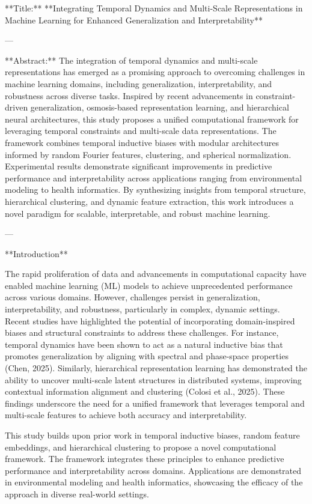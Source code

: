 **Title:**  
**Integrating Temporal Dynamics and Multi-Scale Representations in Machine Learning for Enhanced Generalization and Interpretability**

---

**Abstract:**  
The integration of temporal dynamics and multi-scale representations has emerged as a promising approach to overcoming challenges in machine learning domains, including generalization, interpretability, and robustness across diverse tasks. Inspired by recent advancements in constraint-driven generalization, osmosis-based representation learning, and hierarchical neural architectures, this study proposes a unified computational framework for leveraging temporal constraints and multi-scale data representations. The framework combines temporal inductive biases with modular architectures informed by random Fourier features, clustering, and spherical normalization. Experimental results demonstrate significant improvements in predictive performance and interpretability across applications ranging from environmental modeling to health informatics. By synthesizing insights from temporal structure, hierarchical clustering, and dynamic feature extraction, this work introduces a novel paradigm for scalable, interpretable, and robust machine learning.

---

**Introduction**  

The rapid proliferation of data and advancements in computational capacity have enabled machine learning (ML) models to achieve unprecedented performance across various domains. However, challenges persist in generalization, interpretability, and robustness, particularly in complex, dynamic settings. Recent studies have highlighted the potential of incorporating domain-inspired biases and structural constraints to address these challenges. For instance, temporal dynamics have been shown to act as a natural inductive bias that promotes generalization by aligning with spectral and phase-space properties (Chen, 2025). Similarly, hierarchical representation learning has demonstrated the ability to uncover multi-scale latent structures in distributed systems, improving contextual information alignment and clustering (Colosi et al., 2025). These findings underscore the need for a unified framework that leverages temporal and multi-scale features to achieve both accuracy and interpretability.  

This study builds upon prior work in temporal inductive biases, random feature embeddings, and hierarchical clustering to propose a novel computational framework. The framework integrates these principles to enhance predictive performance and interpretability across domains. Applications are demonstrated in environmental modeling and health informatics, showcasing the efficacy of the approach in diverse real-world settings.

